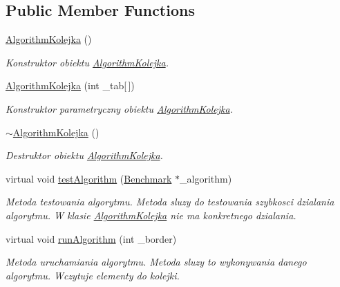 \subsection*{Public Member Functions}
\begin{DoxyCompactItemize}
\item 
\hyperlink{class_algorithm_kolejka_a024b4d14ce3e46ad167fa1961168088e}{Algorithm\+Kolejka} ()
\begin{DoxyCompactList}\small\item\em Konstruktor obiektu \hyperlink{class_algorithm_kolejka}{Algorithm\+Kolejka}. \end{DoxyCompactList}\item 
\hyperlink{class_algorithm_kolejka_a734671abcf48ef75dd1df980b503e618}{Algorithm\+Kolejka} (int \+\_\+tab\mbox{[}$\,$\mbox{]})
\begin{DoxyCompactList}\small\item\em Konstruktor parametryczny obiektu \hyperlink{class_algorithm_kolejka}{Algorithm\+Kolejka}. \end{DoxyCompactList}\item 
\hyperlink{class_algorithm_kolejka_a1df769a80bf632f57437c8d0cf6874d2}{$\sim$\+Algorithm\+Kolejka} ()
\begin{DoxyCompactList}\small\item\em Destruktor obiektu \hyperlink{class_algorithm_kolejka}{Algorithm\+Kolejka}. \end{DoxyCompactList}\item 
virtual void \hyperlink{class_algorithm_kolejka_ac739a8c865d4b71232549d12e0f1f466}{test\+Algorithm} (\hyperlink{class_benchmark}{Benchmark} $\ast$\+\_\+algorithm)
\begin{DoxyCompactList}\small\item\em Metoda testowania algorytmu. Metoda sluzy do testowania szybkosci dzialania algorytmu. W klasie \hyperlink{class_algorithm_kolejka}{Algorithm\+Kolejka} nie ma konkretnego dzialania. \end{DoxyCompactList}\item 
virtual void \hyperlink{class_algorithm_kolejka_ae9da3f1862fd90feb4a3c1d6b4f3dd8d}{run\+Algorithm} (int \+\_\+border)
\begin{DoxyCompactList}\small\item\em Metoda uruchamiania algorytmu. Metoda sluzy to wykonywania danego algorytmu. Wczytuje elementy do kolejki. \end{DoxyCompactList}\end{DoxyCompactItemize}
